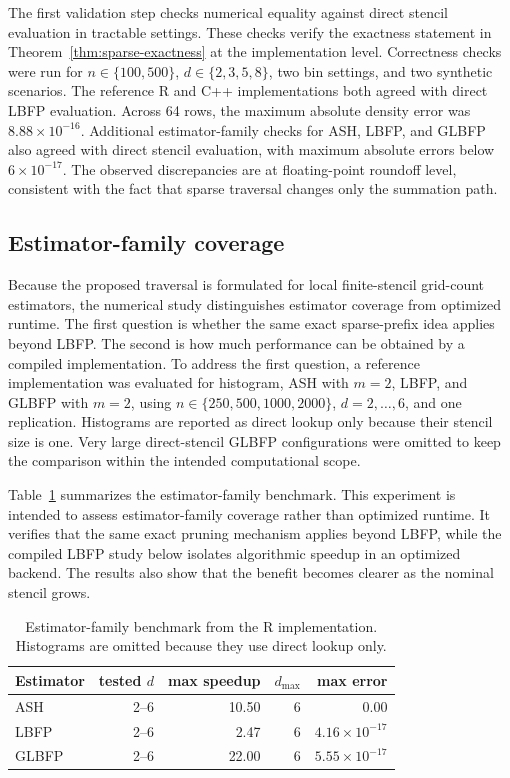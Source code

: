 \documentclass[pdflatex,sn-mathphys-ay]{sn-jnl}
\theoremstyle{thmstyleone}
\begin{document}
The first validation step checks numerical equality against direct stencil evaluation in tractable settings. These checks verify the exactness statement in Theorem~\ref{thm:sparse-exactness} at the implementation level. Correctness checks were run for \(n\in\{100,500\}\), \(d\in\{2,3,5,8\}\), two bin settings, and two synthetic scenarios. The reference R and C++ implementations both agreed with direct LBFP evaluation. Across 64 rows, the maximum absolute density error was \(8.88\times 10^{-16}\). Additional estimator-family checks for ASH, LBFP, and GLBFP also agreed with direct stencil evaluation, with maximum absolute errors below \(6\times 10^{-17}\). The observed discrepancies are at floating-point roundoff level, consistent with the fact that sparse traversal changes only the summation path.

\subsection{Estimator-family coverage}

Because the proposed traversal is formulated for local finite-stencil grid-count estimators, the numerical study distinguishes estimator coverage from optimized runtime. The first question is whether the same exact sparse-prefix idea applies beyond LBFP. The second is how much performance can be obtained by a compiled implementation. To address the first question, a reference implementation was evaluated for histogram, ASH with \(m=2\), LBFP, and GLBFP with \(m=2\), using \(n\in\{250,500,1000,2000\}\), \(d=2,\ldots,6\), and one replication. Histograms are reported as direct lookup only because their stencil size is one. Very large direct-stencil GLBFP configurations were omitted to keep the comparison within the intended computational scope.

Table~\ref{tab:family-benchmark} summarizes the estimator-family benchmark. This experiment is intended to assess estimator-family coverage rather than optimized runtime. It verifies that the same exact pruning mechanism applies beyond LBFP, while the compiled LBFP study below isolates algorithmic speedup in an optimized backend. The results also show that the benefit becomes clearer as the nominal stencil grows.

\begin{table}[t]
\centering
\caption{Estimator-family benchmark from the R implementation. Histograms are omitted because they use direct lookup only.}
\label{tab:family-benchmark}
\begin{tabular}{lrrrr}
\toprule
Estimator & tested \(d\) & max speedup & \(d_{\max}\) & max error \\
\midrule
ASH   & 2--6 & 10.50 & 6 & \(0.00\) \\
LBFP  & 2--6 & 2.47 & 6 & \(4.16\times 10^{-17}\) \\
GLBFP & 2--6 & 22.00 & 6 & \(5.55\times 10^{-17}\) \\
\bottomrule
\end{tabular}
\end{table}
\end{document}
